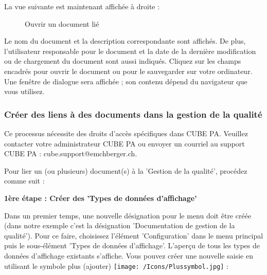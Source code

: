 \pagebreak

La vue suivante est maintenant affichée à droite :

\begin{figure}[H]
\caption{Ouvrir un document lié}
\end{figure}

Le nom du document et la description correspondante sont affichés. De plus, l'utilisateur responsable pour le document et la date de la dernière modification ou de chargement du document sont aussi indiqués. Cliquez sur les champs encadrés pour ouvrir le document ou pour le sauvegarder sur votre ordinateur. Une fenêtre de dialogue sera affichée ; son contenu dépend du navigateur que vous utilisez.

\subsubsection{Créer des liens à des documents dans la gestion de la qualité}
\label{bkm:Ref912000789}

Ce processus nécessite des droits d'accès spécifiques dans CUBE PA. Veuillez contacter votre administrateur CUBE PA ou envoyer un courriel au support CUBE PA : {\color{red} cube.support@emchberger.ch}.

\vspace{\baselineskip}

Pour lier un (ou plusieurs) document(s) à la 'Gestion de la qualité', procédez comme suit :

\vspace{\baselineskip}

\textbf{1ère étape : Créer des 'Types de données d'affichage'}

Dans un premier temps, une nouvelle désignation pour le menu doit être créée (dans notre exemple c'est la désignation 'Documentation de gestion de la qualité'). Pour ce faire, choisissez l'élément 'Configuration' dans le menu principal puis le sous-élément 'Types de données d'affichage'. L'aperçu de tous les types de données d'affichage existants s'affiche. Vous pouvez créer une nouvelle saisie en utilisant le symbole plus (ajouter) \texttt{[image: /Icons/Plussymbol.jpg]}  :

